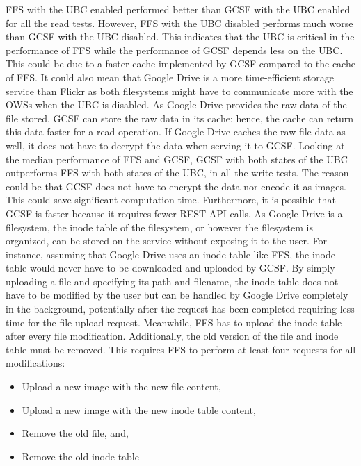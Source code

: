 \gls{FFS} with the \gls{UBC} enabled performed better than \gls{GCSF} with the \gls{UBC} enabled for all the read tests. However, \gls{FFS} with the \gls{UBC} disabled performs much worse than \gls{GCSF} with the \gls{UBC} disabled. This indicates that the \gls{UBC} is critical in the performance of \gls{FFS} while the performance of \gls{GCSF} depends less on the \gls{UBC}. This could be due to a faster cache implemented by \gls{GCSF} compared to the cache of \gls{FFS}. It could also mean that Google Drive is a more \mbox{time-efficient} storage service than Flickr as both filesystems might have to communicate more with the \glspl{OWS} when the \gls{UBC} is disabled. As Google Drive provides the raw data of the file stored, \gls{GCSF} can store the raw data in its cache; hence, the cache can return this data faster for a read operation. If Google Drive caches the raw file data as well, it does not have to decrypt the data when serving it to \gls{GCSF}. Looking at the median performance of \gls{FFS} and \gls{GCSF}, \gls{GCSF} with both states of the \gls{UBC} outperforms \gls{FFS} with both states of the \gls{UBC}, in all the write tests. The reason could be that \gls{GCSF} does not have to encrypt the data nor encode it as images. This could save significant computation time. Furthermore, it is possible that \gls{GCSF} is faster because it requires fewer REST \gls{API} calls. As Google Drive is a filesystem, the inode table of the filesystem, or however the filesystem is organized, can be stored on the service without exposing it to the user. For instance, assuming that Google Drive uses an inode table like \gls{FFS}, the inode table would never have to be downloaded and uploaded by \gls{GCSF}. By simply uploading a file and specifying its path and filename, the inode table does not have to be modified by the user but can be handled by Google Drive completely in the background, potentially after the request has been completed requiring less time for the file upload request. Meanwhile, \gls{FFS} has to upload the inode table after every file modification. Additionally, the old version of the file and inode table must be removed. This requires \gls{FFS} to perform at least four requests for all modifications:
\begin{itemize}
	\item Upload a new image with the new file content,
	\item Upload a new image with the new inode table content,
	\item Remove the old file, and,
	\item Remove the old inode table
\end{itemize}
